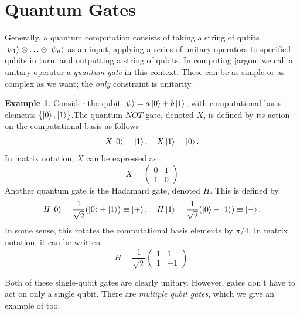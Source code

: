 \documentclass[12pt,a4paper]{report}
\numberwithin{equation}{section}
\theoremstyle{definition}
\theoremstyle{theorem}
\theoremstyle{theorem}
\theoremstyle{example}
\newtheorem{example}{Example}[section]
\theoremstyle{definition}
\begin{document}
\section{Quantum Gates}
Generally, a quantum computation consists of taking a string of qubits $\ket{\psi_{1}}\otimes\ldots\otimes\ket{\psi_{n}}$ as an input, applying a series of unitary operators to specified qubits in turn, and outputting a string of qubits. In computing jargon, we call a unitary operator a \textit{quantum gate} in this context. These can be as simple or as complex as we want; the \textit{only} constraint is unitarity.
\begin{example}
	Consider the qubit $\ket{\psi}=a\ket{0}+b\ket{1}$, with computational basis elements $\{\ket{0},\ket{1}\}$.The quantum $NOT$ gate, denoted $X$, is defined by its action on the computational basis as follows
	\begin{equation}
		X\ket{0}=\ket{1},\quad X\ket{1}=\ket{0}.
	\end{equation}
	In matrix notation, $X$ can be expressed as
	\begin{equation}
		X=\begin{pmatrix}
			0&1\\1&0
		\end{pmatrix}
	\end{equation}
	Another quantum gate is the Hadamard gate, denoted $H$. This is defined by
	\begin{equation}
		H\ket{0}=\frac{1}{\sqrt{2}}(\ket{0}+\ket{1})\equiv\ket{+},\quad H\ket{1}=\frac{1}{\sqrt{2}}(\ket{0}-\ket{1})\equiv\ket{-}.
	\end{equation}
	In some sense, this rotates the computational basis elements by $\pi/4$. In matrix notation, it can be written
	\begin{equation}
		H=\frac{1}{\sqrt{2}}\begin{pmatrix}
			1&1\\1&-1
		\end{pmatrix}.
	\end{equation}
\end{example}
Both of these single-qubit gates are clearly unitary. However, gates don't have to act on only a single qubit. There are \textit{multiple qubit gates}, which we give an example of too.
\end{document}
